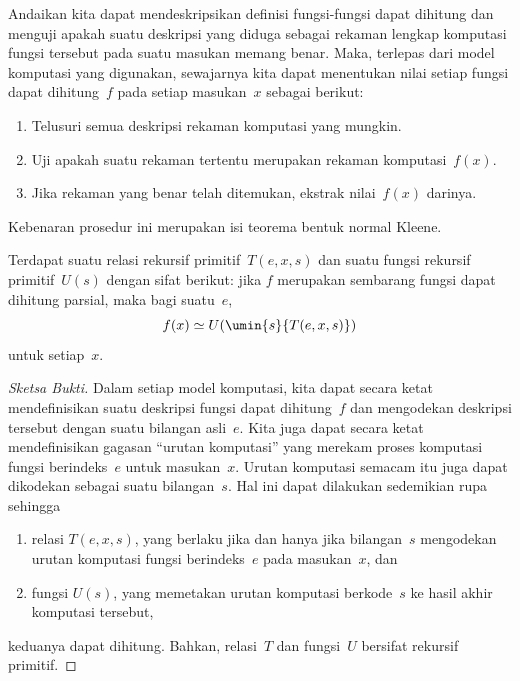 \documentclass[../../../include/open-logic-section]{subfiles}
\begin{document}

Andaikan kita dapat mendeskripsikan definisi fungsi-fungsi dapat dihitung dan
menguji apakah suatu deskripsi yang diduga sebagai rekaman lengkap komputasi
fungsi tersebut pada suatu masukan memang benar. Maka, terlepas dari model
komputasi yang digunakan, sewajarnya kita dapat menentukan nilai setiap fungsi
dapat dihitung~$f$ pada setiap masukan~$x$ sebagai berikut:
\begin{enumerate}
  \item Telusuri semua deskripsi rekaman komputasi yang mungkin.
  \item Uji apakah suatu rekaman tertentu merupakan rekaman komputasi~$f(x)$.
  \item Jika rekaman yang benar telah ditemukan, ekstrak nilai~$f(x)$ darinya.
\end{enumerate}
Kebenaran prosedur ini merupakan isi teorema bentuk normal Kleene.

\begin{thm}
Terdapat suatu relasi rekursif primitif~$T(e, x, s)$ dan suatu fungsi rekursif
primitif~$U(s)$ dengan sifat berikut: jika $f$ merupakan sembarang fungsi dapat
dihitung parsial, maka bagi suatu~$e$,
\[
f(x) \simeq U(\umin{s}{T(e, x, s)})
\]
untuk setiap~$x$.
\end{thm}

\begin{proof}[Sketsa Bukti]
Dalam setiap model komputasi, kita dapat secara ketat mendefinisikan suatu
deskripsi fungsi dapat dihitung~$f$ dan mengodekan deskripsi tersebut dengan
suatu bilangan asli~$e$. Kita juga dapat secara ketat mendefinisikan gagasan
``urutan komputasi'' yang merekam proses komputasi fungsi berindeks~$e$
untuk masukan~$x$. Urutan komputasi semacam itu juga dapat dikodekan sebagai
suatu bilangan~$s$. Hal ini dapat dilakukan sedemikian rupa sehingga
\begin{enumerate}
  \item relasi $T(e, x, s)$, yang berlaku jika dan hanya jika bilangan~$s$
  mengodekan urutan komputasi fungsi berindeks~$e$ pada masukan~$x$, dan
  \item fungsi $U(s)$, yang memetakan urutan komputasi berkode~$s$ ke hasil
  akhir komputasi tersebut,
\end{enumerate}
keduanya dapat dihitung. Bahkan, relasi~$T$ dan fungsi~$U$ bersifat rekursif
primitif.
\end{proof}
\end{document}
